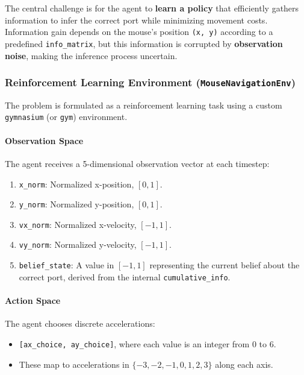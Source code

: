The central challenge is for the agent to \textbf{learn a policy} that efficiently gathers information to infer the correct port while minimizing movement costs. Information gain depends on the mouse's position \texttt{(x, y)} according to a predefined \texttt{info\_matrix}, but this information is corrupted by \textbf{observation noise}, making the inference process uncertain.

\subsubsection*{Reinforcement Learning Environment (\texttt{MouseNavigationEnv})}

The problem is formulated as a reinforcement learning task using a custom \texttt{gymnasium} (or \texttt{gym}) environment.

\paragraph*{Observation Space}

The agent receives a 5-dimensional observation vector at each timestep:

\begin{enumerate}
    \item \texttt{x\_norm}: Normalized x-position, $[0, 1]$.
    \item \texttt{y\_norm}: Normalized y-position, $[0, 1]$.
    \item \texttt{vx\_norm}: Normalized x-velocity, $[-1, 1]$.
    \item \texttt{vy\_norm}: Normalized y-velocity, $[-1, 1]$.
    \item \texttt{belief\_state}: A value in $[-1, 1]$ representing the current belief about the correct port, derived from the internal \texttt{cumulative\_info}.
\end{enumerate}

\paragraph*{Action Space}

The agent chooses discrete accelerations:
\begin{itemize}
    \item \texttt{[ax\_choice, ay\_choice]}, where each value is an integer from 0 to 6.
    \item These map to accelerations in $\{-3, -2, -1, 0, 1, 2, 3\}$ along each axis.
\end{itemize}


